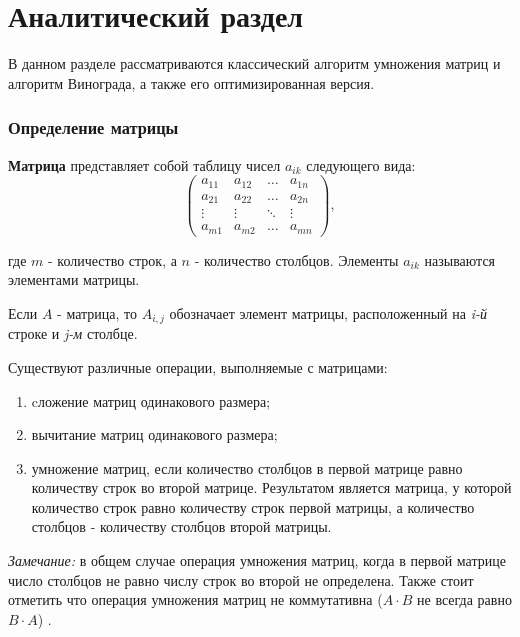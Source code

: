 \chapter{Аналитический раздел}


В данном разделе рассматриваются классический алгоритм умножения матриц и алгоритм Винограда, а также его оптимизированная версия.

\subsection{Определение матрицы}

\textbf{Матрица} \cite{book_matrix} представляет собой таблицу чисел $a_{ik}$ следующего вида:
\begin{equation}
	\begin{pmatrix}
		a_{11} & a_{12} & \ldots & a_{1n}\\
		a_{21} & a_{22} & \ldots & a_{2n}\\
		\vdots & \vdots & \ddots & \vdots\\
		a_{m1} & a_{m2} & \ldots & a_{mn}
	\end{pmatrix},
\end{equation}

где $m$ - количество строк, а $n$ - количество столбцов. Элементы $a_{ik}$ называются элементами матрицы.

Если $A$ - матрица, то $A_{i,j}$ обозначает элемент матрицы, расположенный на \textit{i-й} строке и \textit{j-м} столбце.

Существуют различные операции, выполняемые с матрицами:
\begin{enumerate}
	\item cложение матриц одинакового размера;
	\item вычитание матриц одинакового размера;
	\item умножение матриц, 
	если количество столбцов в первой матрице равно количеству строк во второй матрице.
	Результатом является матрица, у которой количество строк равно количеству строк первой матрицы, 
	а количество столбцов - количеству столбцов второй матрицы. 
\end{enumerate}

\textit{Замечание:} в общем случае операция умножения матриц, 
когда в первой матрице число столбцов не равно числу строк во второй не определена.
Также стоит отметить что операция умножения матриц не коммутативна ($A \cdot B$ не всегда равно $B \cdot A$) \cite{book_matrix}.

\clearpage

